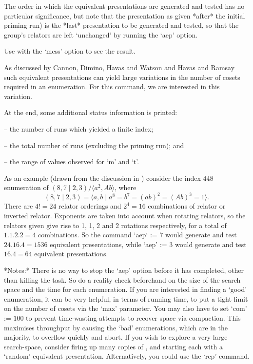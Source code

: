 The  order in  which the  equivalent presentations  are  generated and
tested has no particular  significance, but note that the presentation
as  given *after*  the initial  priming  run) is  the *last*
presentation to be generated and  tested, so that the group's relators
are left `unchanged' by running the `aep' option.

Use  with  the  `mess' option  to  see  the  result. 

As discussed by Cannon, Dimino, Havas and Watson \cite{CDHW73} and Havas
and Ramsay  \cite{HR99} such  equivalent presentations can  yield large
variations in  the number of  cosets required in an  enumeration.  For
this command, we are interested in this variation.

At the end, some additional status information is printed: 


\beginlist
\item{--}  the number of runs which yielded a finite index; 
\item{--}  the total number of runs (excluding the priming run); and 
\item{--}  the range of values observed for `m' and `t'.
\endlist


As an example (drawn from the discussion in \cite{HR99}) consider the index
  $448$ enumeration of $(8,7 \mid 2,3) / \langle a^2,Ab \rangle$,
  where $$ (8,7 \mid 2,3) 
    = \langle a,b \mid a^8 = b^7 = (ab)^2 = (Ab)^3 = 1 \rangle . $$
There are $4!=24$ relator orderings and $2^4=16$ combinations of relator or
inverted relator.
Exponents are taken into account when rotating relators, so the relators
given give rise to 1, 1, 2 and 2 rotations respectively, for a total
of $1.1.2.2=4$ combinations.
So the command `aep` := $7$ would generate and test $24.16.4=1536$ 
equivalent presentations, while `aep' := $3$ would generate and test 
$16.4=64$ equivalent presentations.

*Notes:*
There is  no way  to stop  the `aep' option  before it  has completed,
other than killing the task.  So  do a reality check beforehand on the
size of  the search space and  the time for each  enumeration.  If you
are  interested  in finding  a  `good'  enumeration,  it can  be  very
helpful, in terms of running time,  to put a tight limit on the number
of cosets via the `max' parameter.
You may also have to set `com' := $100$ to prevent time-wasting attempts
to recover space via compaction.
This maximises throughput by causing the `bad' enumerations, which are in
the majority, to overflow quickly and abort.
If you wish to explore a very large search-space, consider firing up many
copies of {\ACE}, and starting each with a `random' equivalent
presentation.
Alternatively, you could use the `rep' command.

